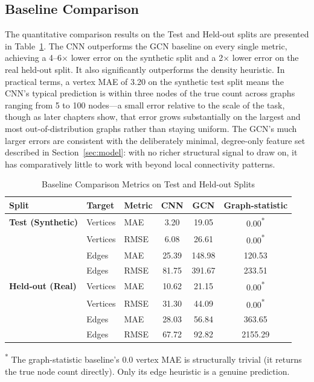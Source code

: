 \documentclass[11pt,letterpaper]{article}
\numberwithin{equation}{section}
\numberwithin{figure}{section}
\numberwithin{table}{section}
\begin{document}
\subsection{Baseline Comparison}
The quantitative comparison results on the Test and Held-out splits are presented in Table~\ref{tab:baseline_comparison}. The CNN outperforms the GCN baseline on every single metric, achieving a 4--6$\times$ lower error on the synthetic split and a 2$\times$ lower error on the real held-out split. It also significantly outperforms the density heuristic. In practical terms, a vertex MAE of 3.20 on the synthetic test split means the CNN's typical prediction is within three nodes of the true count across graphs ranging from 5 to 100 nodes---a small error relative to the scale of the task, though as later chapters show, that error grows substantially on the largest and most out-of-distribution graphs rather than staying uniform. The GCN's much larger errors are consistent with the deliberately minimal, degree-only feature set described in Section~\ref{sec:model}: with no richer structural signal to draw on, it has comparatively little to work with beyond local connectivity patterns.

\begin{table}[htbp]
\centering
\caption{Baseline Comparison Metrics on Test and Held-out Splits}
\label{tab:baseline_comparison}
\begin{tabular}{lllccc}
\toprule
Split & Target & Metric & CNN & GCN & Graph-statistic \\
\midrule
\textbf{Test (Synthetic)} & Vertices & MAE & 3.20 & 19.05 & 0.00\textsuperscript{*} \\
& Vertices & RMSE & 6.08 & 26.61 & 0.00\textsuperscript{*} \\
& Edges & MAE & 25.39 & 148.98 & 120.53 \\
& Edges & RMSE & 81.75 & 391.67 & 233.51 \\
\midrule
\textbf{Held-out (Real)} & Vertices & MAE & 10.62 & 21.15 & 0.00\textsuperscript{*} \\
& Vertices & RMSE & 31.30 & 44.09 & 0.00\textsuperscript{*} \\
& Edges & MAE & 28.03 & 56.84 & 363.65 \\
& Edges & RMSE & 67.72 & 92.82 & 2155.29 \\
\bottomrule
\end{tabular}
\begin{flushleft}
\small \textsuperscript{*} The graph-statistic baseline's 0.0 vertex MAE is structurally trivial (it returns the true node count directly). Only its edge heuristic is a genuine prediction.
\end{flushleft}
\end{table}
\end{document}
